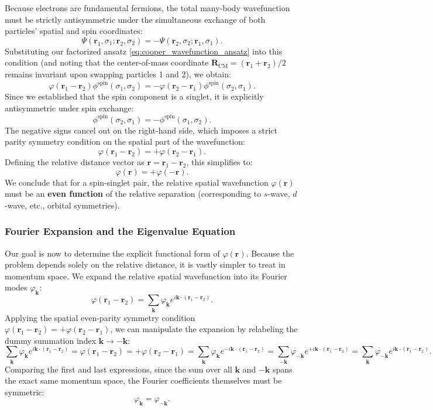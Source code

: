 Because electrons are fundamental fermions, the total many-body wavefunction must be strictly antisymmetric under the simultaneous exchange of both particles' spatial and spin coordinates:
\[
    \Psi(\mathbf{r}_1, \sigma_1; \mathbf{r}_2, \sigma_2) = -\Psi(\mathbf{r}_2, \sigma_2; \mathbf{r}_1, \sigma_1).
\]
Substituting our factorized ansatz \eqref{eq:cooper_wavefunction_ansatz} into this condition (and noting that the center-of-mass coordinate \( \mathbf{R}_{\text{CM}} = (\mathbf{r}_1 + \mathbf{r}_2)/2 \) remains invariant upon swapping particles 1 and 2), we obtain:
\[
    \varphi(\mathbf{r}_1 - \mathbf{r}_2) \phi^{\text{spin}}(\sigma_1, \sigma_2) = -\varphi(\mathbf{r}_2 - \mathbf{r}_1) \phi^{\text{spin}}(\sigma_2, \sigma_1).
\]
Since we established that the spin component is a singlet, it is explicitly antisymmetric under spin exchange:
\[
    \phi^{\text{spin}}(\sigma_2, \sigma_1) = -\phi^{\text{spin}}(\sigma_1, \sigma_2).
\]
The negative signs cancel out on the right-hand side, which imposes a strict parity symmetry condition on the spatial part of the wavefunction:
\[
    \varphi(\mathbf{r}_1 - \mathbf{r}_2) = +\varphi(\mathbf{r}_2 - \mathbf{r}_1).
\]
Defining the relative distance vector as \( \mathbf{r} = \mathbf{r}_1 - \mathbf{r}_2 \), this simplifies to:
\[
    \varphi(\mathbf{r}) = +\varphi(-\mathbf{r}).
\]
We conclude that for a spin-singlet pair, the relative spatial wavefunction \( \varphi(\mathbf{r}) \) must be an \textbf{even function} of the relative separation (corresponding to \( s \)-wave, \( d \)-wave, etc., orbital symmetries).

\subsubsection{Fourier Expansion and the Eigenvalue Equation}

Our goal is now to determine the explicit functional form of \( \varphi(\mathbf{r}) \). Because the problem depends solely on the relative distance, it is vastly simpler to treat in momentum space. We expand the relative spatial wavefunction into its Fourier modes \( \varphi_{\mathbf{k}} \):
\[
    \varphi(\mathbf{r}_1 - \mathbf{r}_2) = \sum_{\mathbf{k}} \varphi_{\mathbf{k}} e^{i\mathbf{k} \cdot (\mathbf{r}_1 - \mathbf{r}_2)}.
\]
Applying the spatial even-parity symmetry condition \( \varphi(\mathbf{r}_1 - \mathbf{r}_2) = +\varphi(\mathbf{r}_2 - \mathbf{r}_1) \), we can manipulate the expansion by relabeling the dummy summation index \( \mathbf{k} \to -\mathbf{k} \):
\[
    \sum_{\mathbf{k}} \varphi_{\mathbf{k}} e^{i\mathbf{k} \cdot (\mathbf{r}_1 - \mathbf{r}_2)} = \varphi(\mathbf{r}_1 - \mathbf{r}_2) = +\varphi(\mathbf{r}_2 - \mathbf{r}_1) = \sum_{\mathbf{k}} \varphi_{\mathbf{k}} e^{-i\mathbf{k} \cdot (\mathbf{r}_1 - \mathbf{r}_2)} = \sum_{-\mathbf{k}} \varphi_{-\mathbf{k}} e^{+i\mathbf{k} \cdot (\mathbf{r}_1 - \mathbf{r}_2)} = \sum_{\mathbf{k}} \varphi_{-\mathbf{k}} e^{i\mathbf{k} \cdot (\mathbf{r}_1 - \mathbf{r}_2)}.
\]
Comparing the first and last expressions, since the sum over all \( \mathbf{k} \) and \( -\mathbf{k} \) spans the exact same momentum space, the Fourier coefficients themselves must be symmetric:
\[
    \varphi_{\mathbf{k}} = \varphi_{-\mathbf{k}}.
\]

